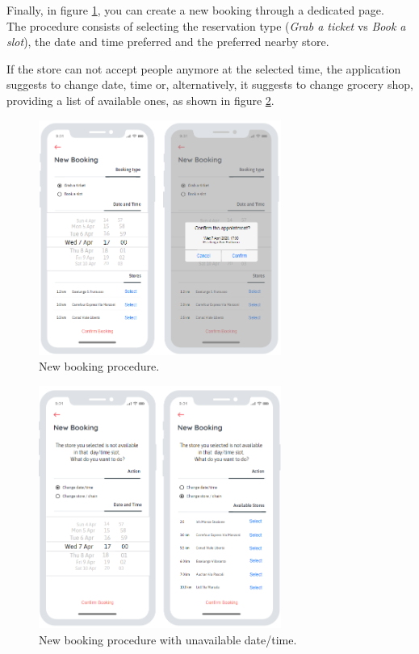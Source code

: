 \documentclass[table, 12pt]{article}
\begin{document}
Finally, in figure \ref{mock_new_booking}, you can create a new booking through a dedicated page.\\
The procedure consists of selecting the reservation type (\textit{Grab a ticket} vs \textit{Book a slot}), the date and time preferred and the preferred nearby store.

If the store can not accept people anymore at the selected time, the application suggests to change date, time or, alternatively, it suggests to change grocery shop, providing a list of available ones, as shown in figure \ref{mock_new_booking_unavailable}.
\begin{figure}[H]
    \begin{center}
        \includegraphics[width=225pt]{assets/mock_new_booking.png}
        \caption{New booking procedure.}
        \label{mock_new_booking}
    \end{center}
\end{figure}

\begin{figure}[H]
    \begin{center}
        \includegraphics[width=225pt]{assets/mock_new_booking_unavailable.png}
        \caption{New booking procedure with unavailable date/time.}
        \label{mock_new_booking_unavailable}
    \end{center}
\end{figure}
\end{document}
